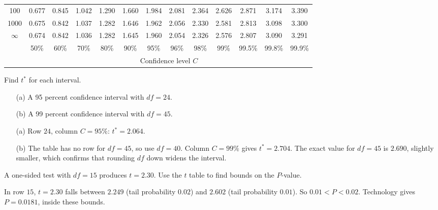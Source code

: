 \begin{table}[H]
\begin{tabular}{c|cccccccccccc}
100 & 0.677 & 0.845 & 1.042 & 1.290 & 1.660 & 1.984 & 2.081 & 2.364 & 2.626 & 2.871 & 3.174 & 3.390 \\
1000 & 0.675 & 0.842 & 1.037 & 1.282 & 1.646 & 1.962 & 2.056 & 2.330 & 2.581 & 2.813 & 3.098 & 3.300 \\
$\infty$ & 0.674 & 0.842 & 1.036 & 1.282 & 1.645 & 1.960 & 2.054 & 2.326 & 2.576 & 2.807 & 3.090 & 3.291 \\
\hline
 & 50\% & 60\% & 70\% & 80\% & 90\% & 95\% & 96\% & 98\% & 99\% & 99.5\% & 99.8\% & 99.9\% \\
 & \multicolumn{12}{c}{Confidence level $C$} \\
\end{tabular}
\end{table}

\begin{Exercise}[title={Critical values for confidence intervals}, label={ex:ttable-ci}]
Find $t^*$ for each interval.
\begin{enumerate}
    \item[(a)] A 95 percent confidence interval with $df = 24$.
    \item[(b)] A 99 percent confidence interval with $df = 45$.
\end{enumerate}
\end{Exercise}

\begin{Answer}[ref={ex:ttable-ci}]
\begin{enumerate}
    \item[(a)] Row $24$, column $C = 95\%$: $t^* = 2.064$.
    \item[(b)] The table has no row for $df = 45$, so use $df = 40$. Column $C = 99\%$ gives $t^* = 2.704$. The exact value for $df = 45$ is $2.690$, slightly smaller, which confirms that rounding $df$ down widens the interval.
\end{enumerate}
\end{Answer}

\begin{Exercise}[title={Bounding a \texorpdfstring{$P$}{P}-value}, label={ex:ttable-pvalue}]
A one-sided test with $df = 15$ produces $t = 2.30$. Use the $t$ table to find bounds on the $P$-value.
\end{Exercise}

\begin{Answer}[ref={ex:ttable-pvalue}]
In row $15$, $t = 2.30$ falls between $2.249$ (tail probability $0.02$) and $2.602$ (tail probability $0.01$). So $0.01 < P < 0.02$. Technology gives $P = 0.0181$, inside these bounds.
\end{Answer}

